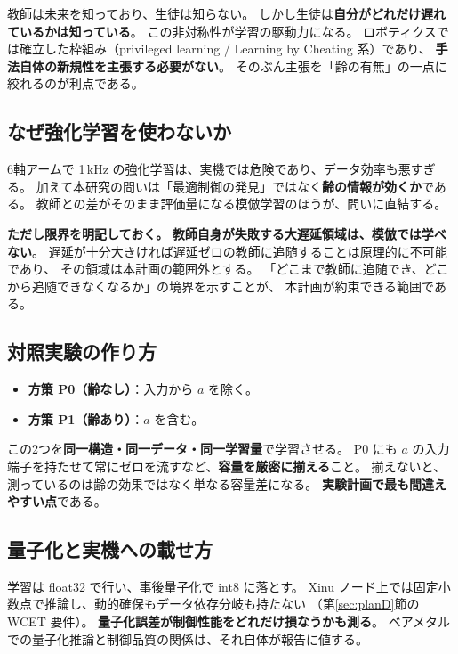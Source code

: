 \documentclass[11pt,a4paper]{article}
\newcommand{\prob}[1]{\textbf{\textcolor{red!55!black}{#1}}}
\newcommand{\keyp}[1]{\textbf{\textcolor{blue!45!black}{#1}}}
\begin{document}
\noindent
教師は未来を知っており、生徒は知らない。
しかし生徒は\keyp{自分がどれだけ遅れているかは知っている}。
この非対称性が学習の駆動力になる。
ロボティクスでは確立した枠組み（privileged learning / Learning by Cheating 系）であり、
\keyp{手法自体の新規性を主張する必要がない}。
そのぶん主張を「齢の有無」の一点に絞れるのが利点である。

\subsection{なぜ強化学習を使わないか}

6軸アームで 1\,kHz の強化学習は、実機では危険であり、データ効率も悪すぎる。
加えて本研究の問いは「最適制御の発見」ではなく\keyp{齢の情報が効くか}である。
教師との差がそのまま評価量になる模倣学習のほうが、問いに直結する。

\medskip
\noindent
\prob{ただし限界を明記しておく。}
\keyp{教師自身が失敗する大遅延領域は、模倣では学べない}。
遅延が十分大きければ遅延ゼロの教師に追随することは原理的に不可能であり、
その領域は本計画の範囲外とする。
「どこまで教師に追随でき、どこから追随できなくなるか」の境界を示すことが、
本計画が約束できる範囲である。

\subsection{対照実験の作り方}

\begin{itemize}[leftmargin=1.4em,itemsep=2pt]
  \item \textbf{方策 P0（齢なし）}：入力から $a$ を除く。
  \item \textbf{方策 P1（齢あり）}：$a$ を含む。
\end{itemize}

\noindent
この2つを\keyp{同一構造・同一データ・同一学習量}で学習させる。
P0 にも $a$ の入力端子を持たせて常にゼロを流すなど、\prob{容量を厳密に揃える}こと。
揃えないと、測っているのは齢の効果ではなく単なる容量差になる。
\keyp{実験計画で最も間違えやすい点}である。

\subsection{量子化と実機への載せ方}

学習は float32 で行い、事後量子化で int8 に落とす。
Xinu ノード上では固定小数点で推論し、動的確保もデータ依存分岐も持たない
（第\ref{sec:planD}節の WCET 要件）。
\keyp{量子化誤差が制御性能をどれだけ損なうかも測る}。
ベアメタルでの量子化推論と制御品質の関係は、それ自体が報告に値する。
\end{document}
